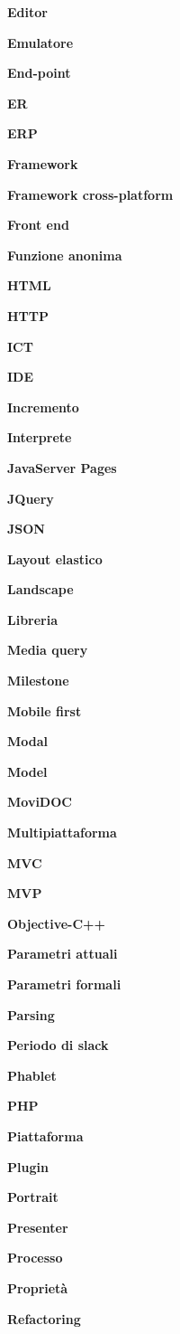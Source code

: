\textbf{Editor}

\textbf{Emulatore}

\textbf{End-point}

\textbf{ER}

\textbf{ERP}

\textbf{Framework}

\textbf{Framework cross-platform}

\textbf{Front end}

\textbf{Funzione anonima}

\textbf{HTML}

\textbf{HTTP}

\textbf{ICT}

\textbf{IDE}

\textbf{Incremento}

\textbf{Interprete}

\textbf{JavaServer Pages}

\textbf{JQuery}

\textbf{JSON}

\textbf{Layout elastico}

\textbf{Landscape}

\textbf{Libreria}

\textbf{Media query}

\textbf{Milestone}

\textbf{Mobile first}

\textbf{Modal}

\textbf{Model}

\textbf{MoviDOC}

\textbf{Multipiattaforma}

\textbf{MVC}

\textbf{MVP}

\textbf{Objective-C++}

\textbf{Parametri attuali}

\textbf{Parametri formali}

\textbf{Parsing}

\textbf{Periodo di slack}

\textbf{Phablet}

\textbf{PHP}

\textbf{Piattaforma}

\textbf{Plugin}

\textbf{Portrait}

\textbf{Presenter}

\textbf{Processo}

\textbf{Proprietà}

\textbf{Refactoring}

